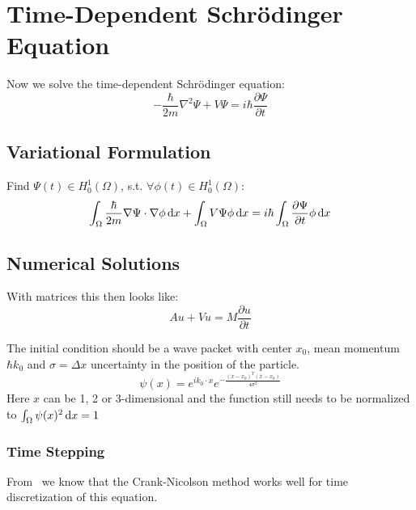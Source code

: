 \documentclass[a4paper,11pt]{scrartcl}
\newcommand*{\dx}{\dif{}x}
\begin{document}
\section{Time-Dependent Schrödinger Equation}
Now we solve the time-dependent Schrödinger equation:
\[ -\frac{\hbar}{2m} \nabla^2 \Psi + V \Psi = i \hbar \frac{\partial\Psi}{\partial{}t}\]

\subsection{Variational Formulation}

Find $\Psi(t) \in H^1_0(\Omega)$, s.t. $\forall \phi(t) \in H^1_0(\Omega)$:
\[ \int_{\Omega} \frac{\hbar}{2m} \nabla \Psi \cdot \nabla\phi \dx +
  \int_{\Omega} V \Psi \phi\dx = i \hbar\int_{\Omega}
  \frac{\partial\Psi}{\partial{}t} \phi\dx\]

\subsection{Numerical Solutions}
With matrices this then looks like:
\[A u + V u = M \frac{\partial{}u}{\partial{}t}\]

The initial condition should be a wave packet with center $x_0$, mean momentum
$\hbar k_0$ and $\sigma = \Delta x$ uncertainty in the position of the particle.
\[\psi(x) =  e^{ik_0\cdot x}e^{-\frac{(x-x_0)^T(x-x_0)}{4\sigma^2}}\]
Here $x$ can be 1, 2 or 3-dimensional and the function still needs to be
normalized to $\int_{\Omega}\psi(x)^2\dx = 1$

\subsubsection{Time Stepping}
From~\cite{Sehra07} we know that the Crank-Nicolson method works well for time
discretization of this equation.

{}

\end{document}

